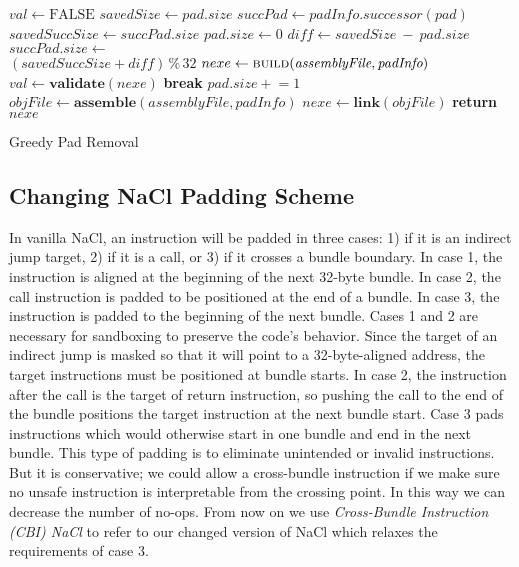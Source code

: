 \documentclass[conference]{IEEEtran}
\begin{document}
\begin{algorithm}[!t]

\begin{algorithmic}[1]
\State $val \gets \text{FALSE}$
\State $savedSize \gets pad.size$
\State $succPad \gets \textit{padInfo}.successor(pad)$
\State $savedSuccSize \gets succPad.size$
\State $pad.size \gets 0$
{}
\State $\textit{diff} \gets savedSize~-~pad.size$
\State $succPad.size \gets$ 
\\ \hfill $(savedSuccSize + \textit{diff}) \mathbin{\%} 32$
\EndIf
\State $nexe \gets \textsc{build}(\textit{assemblyFile}, \textit{padInfo})$
\State $val \gets \textbf{validate}(nexe)$
\State \textbf{break}
\EndIf
\State $pad.size \mathrel{+}= 1 $
\EndWhile
\EndFor
\EndProcedure 
{}
\State $objFile \gets \textbf{assemble}(\textit{assemblyFile}, \textit{padInfo})$
\State $nexe \gets \textbf{link}(objFile)$
\State \textbf{return} $nexe$
\EndProcedure
\end{algorithmic}
\caption{Greedy Pad Removal}\label{pad_removal}
\end{algorithm}


\subsection{Changing NaCl Padding Scheme}
\label{sec:pad_rm}
In vanilla  NaCl, an instruction will be padded in three cases: 1) if it is an indirect jump target, 2) if it is a call, or 3) if it  crosses a bundle boundary. In case 1, the instruction is aligned at the beginning  of the next 32-byte bundle. In case 2, the call instruction is padded to be positioned at the end of a bundle. In  case 3, the instruction is padded to the beginning  of the next bundle. Cases 1 and 2 are necessary for sandboxing to preserve the code's behavior. Since the target of an indirect jump is masked so that it will point to a 32-byte-aligned address,  the target instructions must be positioned at bundle starts. In case 2, the instruction after the call is the target of return instruction, so pushing the call to the end of the bundle positions the target instruction at the next bundle start. Case 3 pads instructions which would otherwise start in one bundle and end in the next bundle. This type of padding is to eliminate   unintended or invalid instructions. But it is conservative; we could allow a cross-bundle instruction if we make sure  no unsafe instruction is interpretable from the crossing point. In this way we can decrease the number of no-ops. From now on we use \textit{Cross-Bundle Instruction (CBI) NaCl} to refer to our changed version of NaCl which relaxes the requirements of case 3.
\end{document}
